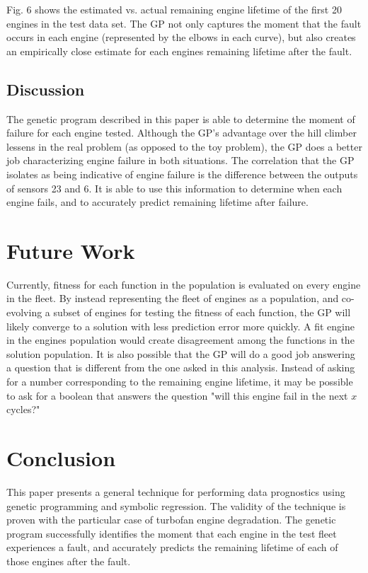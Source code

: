 \documentclass{acm_proc_article-sp}
\begin{document}
Fig. 6 shows the estimated vs. actual remaining engine lifetime of the first 20 engines in the test data set. The GP not only captures the moment that the fault occurs in each engine (represented by the elbows in each curve), but also creates an empirically close estimate for each engines remaining lifetime after the fault.


\subsection{Discussion}
The genetic program described in this paper is able to determine the moment of failure for each engine tested. Although the GP's advantage over the hill climber lessens in the real problem (as opposed to the toy problem), the GP does a better job characterizing engine failure in both situations. The correlation that the GP isolates as being indicative of engine failure is the difference between the outputs of sensors 23 and 6. It is able to use this information to determine when each engine fails, and to accurately predict remaining lifetime after failure.

\section{Future Work}
Currently, fitness for each function in the population is evaluated on every engine in the fleet. By instead representing the fleet of engines as a population, and co-evolving a subset of engines for testing the fitness of each function, the GP will likely converge to a solution with less prediction error more quickly. A fit engine in the engines population would create disagreement among the functions in the solution population. It is also possible that the GP will do a good job answering a question that is different from the one asked in this analysis. Instead of asking for a number corresponding to the remaining engine lifetime, it may be possible to ask for a boolean that answers the question "will this engine fail in the next $x$ cycles?"

\section{Conclusion}
This paper presents a general technique for performing data prognostics using genetic programming and symbolic regression. The validity of the technique is proven with the particular case of turbofan engine degradation. The genetic program successfully identifies the moment that each engine in the test fleet experiences a fault, and accurately predicts the remaining lifetime of each of those engines after the fault. 
\end{document}
